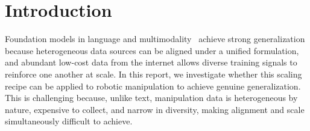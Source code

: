 \section{Introduction}
\label{sec:intro}



Foundation models in language and multimodality~\citep{gpt3,gpt4,dubey2024llama,gemini,yang2025qwen3,qwen3-vl,qwen35blog} achieve strong generalization because heterogeneous data sources can be aligned under a unified formulation, and abundant low-cost data from the internet allows diverse training signals to reinforce one another at scale. 
In this report, we investigate whether this scaling recipe can be applied to robotic manipulation to achieve genuine generalization. 
This is challenging because, unlike text, manipulation data is heterogeneous by nature, expensive to collect, and narrow in diversity, making alignment and scale simultaneously difficult to achieve.




